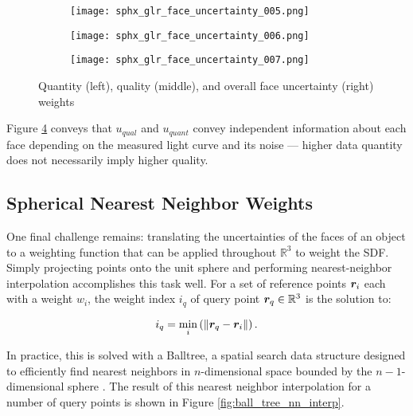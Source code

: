 \begin{figure}
  \centering
  \begin{subfigure}[b]{0.3\textwidth}
      \centering
      \texttt{[image: sphx\_glr\_face\_uncertainty\_005.png]}
      \label{fig:quant_weights}
  \end{subfigure}
  \hfill
  \begin{subfigure}[b]{0.3\textwidth}
      \centering
      \texttt{[image: sphx\_glr\_face\_uncertainty\_006.png]}
      \label{fig:qual_weights}
  \end{subfigure}
  \hfill
  \begin{subfigure}[b]{0.3\textwidth}
      \centering
      \texttt{[image: sphx\_glr\_face\_uncertainty\_007.png]}
      \label{fig:qual_overall}
  \end{subfigure}
  \caption{Quantity (left), quality (middle), and overall face uncertainty (right) weights}
  \label{fig:face_uncertainties}
\end{figure}

Figure \ref{fig:face_uncertainties} conveys that $u_{qual}$ and $u_{quant}$ convey independent information about each face depending on the measured light curve and its noise --- higher data quantity does not necessarily imply higher quality.

\subsection{Spherical Nearest Neighbor Weights} \label{sec:nearest_sphere}

One final challenge remains: translating the uncertainties of the faces of an object to a weighting function that can be applied throughout $\mathbb{R}^3$ to weight the SDF. Simply projecting points onto the unit sphere and performing nearest-neighbor interpolation accomplishes this task well. For a set of reference points $\bm{r}_{i}$ each with a weight $w_i$, the weight index $i_q$ of query point $\bm{r}_q \in \mathbb{R}^3$ is the solution to:

\begin{equation}
  i_{q} = \min_{i}\left( \| \bm{r}_q - \bm{r}_i \| \right).
\end{equation}

In practice, this is solved with a Balltree, a spatial search data structure designed to efficiently find nearest neighbors in $n$-dimensional space bounded by the $n-1$-dimensional sphere \cite{omohundro1989}. The result of this nearest neighbor interpolation for a number of query points is shown in Figure \ref{fig:ball_tree_nn_interp}.


